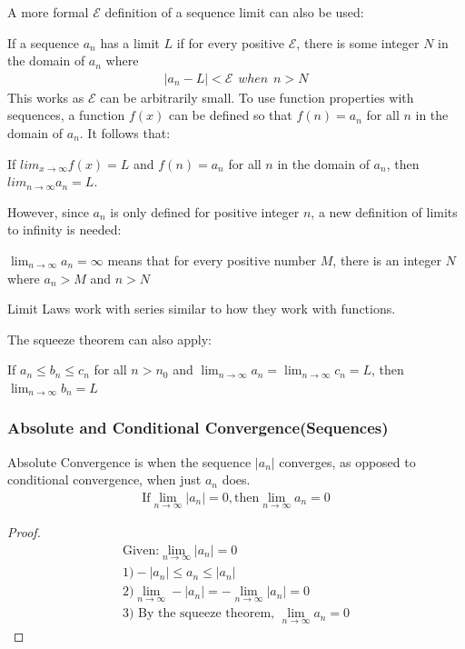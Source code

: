 \documentclass{article}
\begin{document}
A more formal $\mathcal{E}$ definition of a sequence limit can also be used:

If a sequence $a_n$ has a limit $L$ if for every positive $\mathcal{E}$, there is some integer $N$ in the domain of $a_n$ where
\begin{gather*}
    |a_n - L| < \mathcal{E}\hspace{5pt}when\hspace{5pt}n > N
\end{gather*}
This works as $\mathcal{E}$ can be arbitrarily small.
To use function properties with sequences, a function $f(x)$ can be defined so that $f(n) = a_n$ for all $n$ in the domain of $a_n$. It follows that:

If $lim_{x \to \infty} f(x) = L$ and $f(n) = a_n$ for all $n$ in the domain of $a_n$, then $lim_{n \to \infty} a_n = L$.

However, since $a_n$ is only defined for positive integer $n$, a new definition of limits to infinity is needed:

    $\lim_{n \to \infty} a_n = \infty$ means that for every positive number $M$, there is an integer $N$ where  $a_n > M$ and $n > N$

Limit Laws work with series similar to how they work with functions.

The squeeze theorem can also apply:

If $a_n \leqslant b_n \leqslant c_n$ for all $n > n_0$ and $\lim_{n \to \infty} a_n = \lim_{n \to \infty} c_n = L$, then $\lim_{n \to \infty} b_n = L$
\subsubsection{Absolute and Conditional Convergence(Sequences)}
Absolute Convergence is when the sequence $|a_n|$ converges, as opposed to conditional convergence, when just $a_n$ does.
\begin{gather*}
    \textrm{If} \lim_{n \to \infty} |a_n| = 0, \textrm{then} \lim_{n \to \infty} a_n = 0
\end{gather*}
\begin{proof}
\begin{gather*}
    \textrm{Given:} \lim_{n \to \infty} |a_n| = 0\\
    1) -|a_n| \leqslant a_n \leqslant |a_n|\\
    2) \lim_{n \to \infty} -|a_n| = -\lim_{n \to \infty} |a_n| = 0\\
    3) \textrm{ By the squeeze theorem, } \lim_{n \to \infty} a_n = 0
\end{gather*}
\end{proof}
\end{document}
